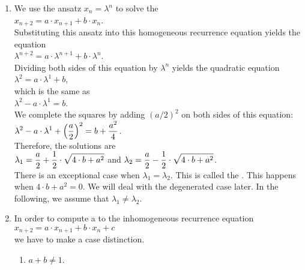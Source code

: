 \begin{enumerate}
\item We use the ansatz $x_n = \lambda^n$ to solve the 
      \\[0.2cm]
      \hspace*{1.3cm}
      $x_{n+2} = a \cdot x_{n+1} + b \cdot x_n$.
      \\[0.2cm]
      Substituting this ansatz into this homogeneous recurrence equation yields the equation
      \\[0.2cm]
      \hspace*{1.3cm}
      $\lambda^{n+2} = a \cdot \lambda^{n+1} + b \cdot \lambda^n$.
      \\[0.2cm]
      Dividing both sides of this equation by $\lambda^n$ yields the quadratic equation
      \\[0.2cm]
      \hspace*{1.3cm}
      $\lambda^{2} = a \cdot \lambda^{1} + b$,
      \\[0.2cm]
      which is the same as
      \\[0.2cm]
      \hspace*{1.3cm}
      $\lambda^{2} - a \cdot \lambda^{1} = b$.
      \\[0.2cm]
      We complete the squares by adding $(a/2)^2$ on both sides of this equation:
      \\[0.2cm]
      \hspace*{1.3cm}
      $\displaystyle \lambda^{2} - a \cdot \lambda^{1} + \Bigl(\frac{a}{2}\Bigr)^2 = b + \frac{a^2}{4}$.
      \\[0.2cm]
      Therefore, the solutions are
      \\[0.2cm]
      \hspace*{1.3cm}
      $\displaystyle\lambda_1 = \frac{a}{2} + \frac{1}{2} \cdot \sqrt{4 \cdot b + a^2}$ \quad and \quad
      $\displaystyle\lambda_2 = \frac{a}{2} - \frac{1}{2} \cdot \sqrt{4 \cdot b + a^2}$.
      \\[0.2cm]
      There is an exceptional case when $\lambda_1 = \lambda_2$.  This is called the 
      .
      This happens when $4 \cdot b + a^2 = 0$.  We will deal with the degenerated case later.  In the
      following, we assume that $\lambda_1 \not= \lambda_2$.
\item In order to compute a   to the inhomogeneous recurrence equation
      \\[0.2cm]
      \hspace*{1.3cm}
      $x_{n+2} = a \cdot x_{n+1} + b \cdot x_n + c$
      \\[0.2cm]
      we have to make a case distinction.
      \begin{enumerate}
      \item $a + b \not= 1$.


\end{enumerate}
\end{enumerate}
